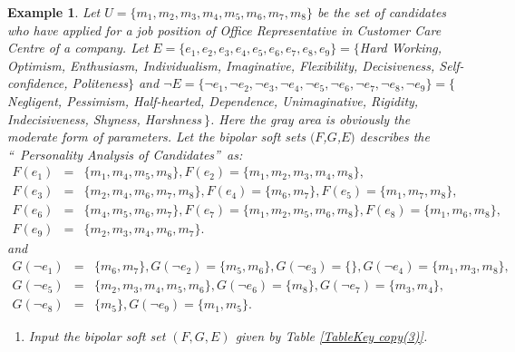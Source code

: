 \documentclass{amsart}
\theoremstyle{plain}
\newtheorem{example}{Example}
\numberwithin{equation}{section}
\begin{document}
\begin{example}
Let $U=\{m_{1},m_{2},m_{3},m_{4},m_{5},m_{6},m_{7},m_{8}\}$ be the set of
candidates who have applied for a job position of Office Representative in
Customer Care Centre of a company. Let $E=\{e_{1},e_{2},e_{3},e_{4},e_{5},e_{6},e_{7},e_{8},e_{9}\}=\{$Hard Working,
Optimism, Enthusiasm, Individualism, Imaginative, Flexibility, Decisiveness,
Self-confidence, Politeness$\}$ and $\lnot E=\{\lnot e_{1},\lnot e_{2},\lnot
e_{3},\lnot e_{4},\lnot e_{5},\lnot e_{6},\lnot e_{7},\lnot e_{8},\lnot
e_{9}\}=\{$Negligent, Pessimism, Half-hearted, Dependence, Unimaginative,
Rigidity, Indecisiveness, Shyness, Harshness$\ \}$. Here the gray area is
obviously the moderate form of parameters. Let the bipolar soft sets $(F$,$G$,$E)$ describes the \textquotedblleft\ Personality Analysis of
Candidates\textquotedblright\ as:\begin{eqnarray*}
F(e_{1})
&=&\{m_{1},m_{4},m_{5},m_{8}\},F(e_{2})=\{m_{1},m_{2},m_{3},m_{4},m_{8}\}, \\
F(e_{3})
&=&\{m_{2},m_{4},m_{6},m_{7},m_{8}\},F(e_{4})=\{m_{6},m_{7}\},F(e_{5})=\{m_{1},m_{7},m_{8}\}, \\
F(e_{6})
&=&\{m_{4},m_{5},m_{6},m_{7}\},F(e_{7})=\{m_{1},m_{2},m_{5},m_{6},m_{8}\},F(e_{8})=\{m_{1},m_{6},m_{8}\}, \\
F(e_{9}) &=&\{m_{2},m_{3},m_{4},m_{6},m_{7}\}\text{.}
\end{eqnarray*}and\begin{eqnarray*}
G(\lnot e_{1}) &=&\{m_{6},m_{7}\},G(\lnot e_{2})=\{m_{5},m_{6}\},G(\lnot
e_{3})=\{\},G(\lnot e_{4})=\{m_{1},m_{3},m_{8}\}, \\
G(\lnot e_{5}) &=&\{m_{2},m_{3},m_{4},m_{5},m_{6}\},G(\lnot
e_{6})=\{m_{8}\},G(\lnot e_{7})=\{m_{3},m_{4}\}, \\
G(\lnot e_{8}) &=&\{m_{5}\},G(\lnot e_{9})=\{m_{1},m_{5}\}\text{.}
\end{eqnarray*}

\begin{enumerate}
\item Input the bipolar soft set $(F,G,E)$ given by Table \ref{TableKey
copy(3)}.


\end{enumerate}
\end{example}
\end{document}
